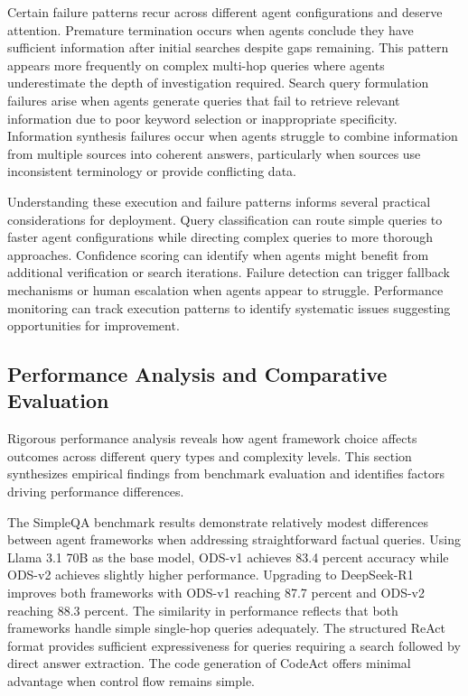 Certain failure patterns recur across different agent configurations and deserve attention. Premature termination occurs when agents conclude they have sufficient information after initial searches despite gaps remaining. This pattern appears more frequently on complex multi-hop queries where agents underestimate the depth of investigation required. Search query formulation failures arise when agents generate queries that fail to retrieve relevant information due to poor keyword selection or inappropriate specificity. Information synthesis failures occur when agents struggle to combine information from multiple sources into coherent answers, particularly when sources use inconsistent terminology or provide conflicting data.

Understanding these execution and failure patterns informs several practical considerations for deployment. Query classification can route simple queries to faster agent configurations while directing complex queries to more thorough approaches. Confidence scoring can identify when agents might benefit from additional verification or search iterations. Failure detection can trigger fallback mechanisms or human escalation when agents appear to struggle. Performance monitoring can track execution patterns to identify systematic issues suggesting opportunities for improvement.

\subsection{Performance Analysis and Comparative Evaluation}

Rigorous performance analysis reveals how agent framework choice affects outcomes across different query types and complexity levels. This section synthesizes empirical findings from benchmark evaluation and identifies factors driving performance differences.

The SimpleQA benchmark results demonstrate relatively modest differences between agent frameworks when addressing straightforward factual queries. Using Llama 3.1 70B as the base model, ODS-v1 achieves 83.4 percent accuracy while ODS-v2 achieves slightly higher performance. Upgrading to DeepSeek-R1 improves both frameworks with ODS-v1 reaching 87.7 percent and ODS-v2 reaching 88.3 percent. The similarity in performance reflects that both frameworks handle simple single-hop queries adequately. The structured ReAct format provides sufficient expressiveness for queries requiring a search followed by direct answer extraction. The code generation of CodeAct offers minimal advantage when control flow remains simple.

